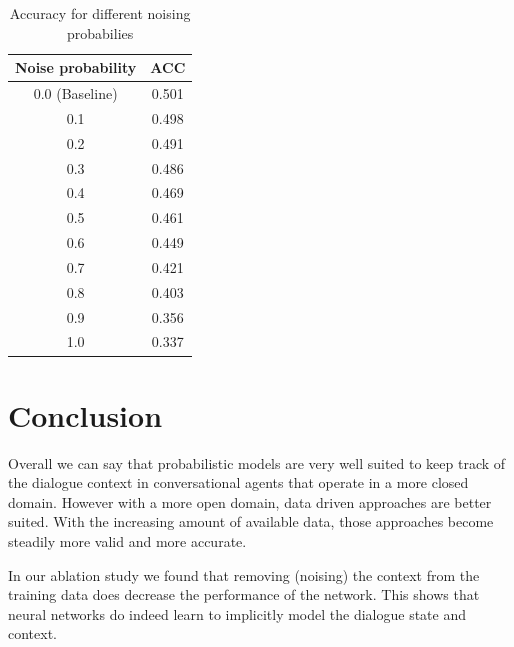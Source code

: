 \documentclass[conference]{IEEEtran}
\begin{document}
\begin{table}[!t]
\caption{Accuracy for different noising probabilies}
\label{tbl:noiseresults}
\centering
\begin{tabular}{c|c}
Noise probability & ACC\\
\hline
0.0 (Baseline) &	0.501\\			
0.1 &	0.498\\
0.2 &	0.491\\	
0.3 &	0.486\\
0.4 &	0.469\\
0.5 &	0.461\\
0.6 &	0.449\\
0.7 &	0.421\\
0.8 &	0.403\\
0.9 &	0.356\\
1.0 &	0.337\\
\hline
\end{tabular}
\end{table}


\section{Conclusion}
Overall we can say that probabilistic models are very well suited to keep track of the dialogue context in conversational agents that operate in a more closed domain. However with a more open domain, data driven approaches are better suited. 
With the increasing amount of available data, those approaches become steadily more valid and more accurate.

In our ablation study we found that removing (noising) the context from the training data does decrease the performance of the network. This shows that neural networks do indeed learn to implicitly model the dialogue state and context.
\end{document}
